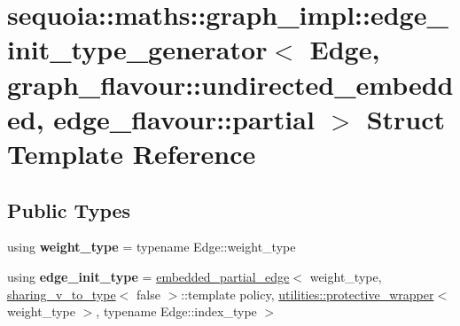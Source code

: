 \hypertarget{structsequoia_1_1maths_1_1graph__impl_1_1edge__init__type__generator_3_01_edge_00_01graph__flavoc7f4d456a173fde3d13f1886bb621bc8}{}\section{sequoia\+::maths\+::graph\+\_\+impl\+::edge\+\_\+init\+\_\+type\+\_\+generator$<$ Edge, graph\+\_\+flavour\+::undirected\+\_\+embedded, edge\+\_\+flavour\+::partial $>$ Struct Template Reference}
\label{structsequoia_1_1maths_1_1graph__impl_1_1edge__init__type__generator_3_01_edge_00_01graph__flavoc7f4d456a173fde3d13f1886bb621bc8}
\subsection*{Public Types}
\begin{DoxyCompactItemize}
\item 
\mbox{\label{structsequoia_1_1maths_1_1graph__impl_1_1edge__init__type__generator_3_01_edge_00_01graph__flavoc7f4d456a173fde3d13f1886bb621bc8_a195f7065ab430122c83d5697f1316174}} 
using {\bfseries weight\+\_\+type} = typename Edge\+::weight\+\_\+type
\item 
\mbox{\label{structsequoia_1_1maths_1_1graph__impl_1_1edge__init__type__generator_3_01_edge_00_01graph__flavoc7f4d456a173fde3d13f1886bb621bc8_a37453ed51d9c1e1d12474d2241502f66}} 
using {\bfseries edge\+\_\+init\+\_\+type} = \mbox{\hyperlink{classsequoia_1_1maths_1_1embedded__partial__edge}{embedded\+\_\+partial\+\_\+edge}}$<$ weight\+\_\+type, \mbox{\hyperlink{structsequoia_1_1maths_1_1graph__impl_1_1sharing__v__to__type}{sharing\+\_\+v\+\_\+to\+\_\+type}}$<$ false $>$\+::template policy, \mbox{\hyperlink{classsequoia_1_1utilities_1_1protective__wrapper}{utilities\+::protective\+\_\+wrapper}}$<$ weight\+\_\+type $>$, typename Edge\+::index\+\_\+type $>$
\end{DoxyCompactItemize}
